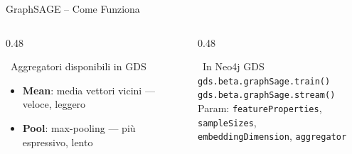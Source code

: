 \documentclass[aspectratio=169]{beamer}
\newcommand{\icoCogs}{\faCogs}
\newcommand{\icoCode}{\faCode}
\newcommand{\icoCheck}{\faCheckCircle}
\newcommand{\icoCogs}{\ding{102}}
\newcommand{\icoCode}{\texttt{</>}}
\newcommand{\icoCheck}{\ding{52}}
\newcommand{\pro}{{\color{successGreen}\icoCheck}}
\begin{document}
\begin{frame}{GraphSAGE -- Come Funziona}
  \begin{columns}[T]
    \begin{column}{0.48\textwidth}
      \begin{block}{\icoCogs\ Aggregatori disponibili in GDS}
        \footnotesize
        \begin{itemize}
          \setlength{\itemsep}{1pt}
          \setlength{\parskip}{0pt}
          \item[\pro] \textbf{Mean}: media vettori vicini — veloce, leggero
          \item[\pro] \textbf{Pool}: max-pooling — pi\`u espressivo, lento
        \end{itemize}
      \end{block}
    \end{column}
    \begin{column}{0.48\textwidth}
      \begin{block}{\icoCode\ In Neo4j GDS}
        \footnotesize
        \texttt{gds.beta.graphSage.train()}\\
        \texttt{gds.beta.graphSage.stream()}\\[3pt]
        {\scriptsize Param: \texttt{featureProperties}, \texttt{sampleSizes},\\
        \texttt{embeddingDimension}, \texttt{aggregator}}
      \end{block}
    \end{column}
  \end{columns}
\end{frame}
\end{document}
